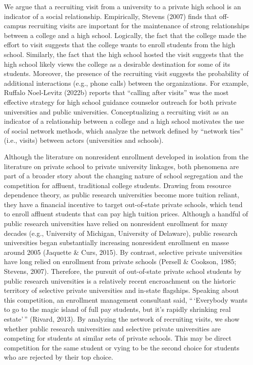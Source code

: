 \documentclass[
  12pt,
]{article}
\begin{document}
We argue that a recruiting visit from a university to a private high school is an indicator of a social relationship. Empirically, Stevens (2007) finds that off-campus recruiting visits are important for the maintenance of strong relationships between a college and a high school. Logically, the fact that the college made the effort to visit suggests that the college wants to enroll students from the high school. Similarly, the fact that the high school hosted the visit suggests that the high school likely views the college as a desirable destination for some of its students. Moreover, the presence of the recruiting visit suggests the probability of additional interactions (e.g., phone calls) between the organizations. For example, Ruffalo Noel-Levitz (2022b) reports that ``calling after visits'' was the most effective strategy for high school guidance counselor outreach for both private universities and public universities. Conceptualizing a recruiting visit as an indicator of a relationship between a college and a high school motivates the use of social network methods, which analyze the network defined by ``network ties'' (i.e., visits) between actors (universities and schools).

Although the literature on nonresident enrollment developed in isolation from the literature on private school to private university linkages, both phenomena are part of a broader story about the changing nature of school segregation and the competition for affluent, traditional college students. Drawing from resource dependence theory, as public research universities become more tuition reliant, they have a financial incentive to target out-of-state private schools, which tend to enroll affluent students that can pay high tuition prices. Although a handful of public research universities have relied on nonresident enrollment for many decades (e.g., University of Michigan, University of Delaware), public research universities began substantially increasing nonresident enrollment en masse around 2005 (Jaquette \& Curs, 2015). By contrast, selective private universities have long relied on enrollment from private schools (Persell \& Cookson, 1985; Stevens, 2007). Therefore, the pursuit of out-of-state private school students by public research universities is a relatively recent encroachment on the historic territory of selective private universities and in-state flagships. Speaking about this competition, an enrollment management consultant said, ``\,`Everybody wants to go to the magic island of full pay students, but it's rapidly shrinking real estate'\,'' (Rivard, 2013). By analyzing the network of recruiting visits, we show whether public research universities and selective private universities are competing for students at similar sets of private schools. This may be direct competition for the same student or vying to be the second choice for students who are rejected by their top choice.
\end{document}
